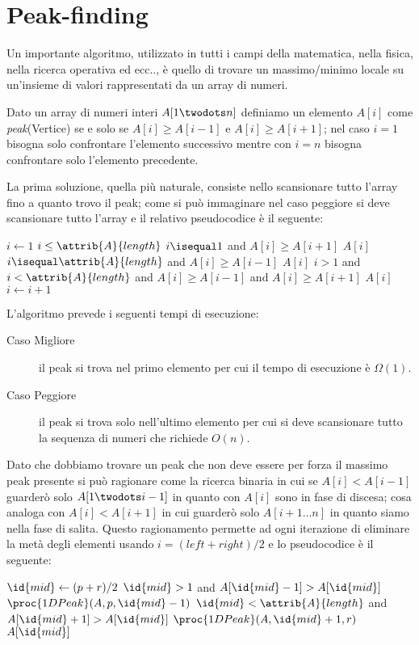 \section{Peak-finding}
Un importante algoritmo, utilizzato in tutti i campi della matematica, nella fisica,
nella ricerca operativa ed ecc.., è quello di trovare un massimo/minimo locale
su un'insieme di valori rappresentati da un array di numeri.

Dato un array di numeri interi $A[1 \twodots n]$ definiamo un elemento $A[i]$
come \emph{peak}(Vertice) se e solo se $A[i] \geq A[i-1]$ e $A[i] \geq A[i+1]$;
nel caso $i = 1$ bisogna solo confrontare l'elemento successivo mentre con $i=n$
bisogna confrontare solo l'elemento precedente.

La prima soluzione, quella più naturale, consiste nello scansionare tutto l'array
fino a quanto trovo il peak; come si può immaginare nel caso peggiore si deve scansionare
tutto l'array e il relativo pseudocodice è il seguente:
\begin{codebox}
\li $i \gets 1$
\li \While $i \leq \attrib{A}{length}$
    \Do
\li                \If $i \isequal 1$ and $A[i] \geq A[i+1]$
\li                          \Return $A[i]$
\li                \If $i \isequal \attrib{A}{length}$ and $A[i] \geq A[i-1]$
\li                          \Return $A[i]$
\li                \If $i > 1$ and $i < \attrib{A}{length}$ and $A[i] \geq A[i-1]$ and $A[i] \geq A[i+1]$
\li                          \Return $A[i]$
\li                $i \gets i + 1$
\end{codebox}

L'algoritmo prevede i seguenti tempi di esecuzione:
\begin{description}
  \item[Caso Migliore] il peak si trova nel primo elemento per cui il tempo di esecuzione è $\Omega(1)$.
  \item[Caso Peggiore] il peak si trova solo nell'ultimo elemento per cui si deve
                       scansionare tutto la sequenza di numeri che richiede $O(n)$.
\end{description}

Dato che dobbiamo trovare un peak che non deve essere per forza il massimo peak presente
si può ragionare come la ricerca binaria in cui se $A[i] < A[i-1]$ guarderò solo $A[1 \twodots i-1]$
in quanto con $A[i]$ sono in fase di discesa; cosa analoga con $A[i] < A[i+1]$ in cui
guarderò solo $A[i+1 \dots n]$ in quanto siamo nella fase di salita.
Questo ragionamento permette ad ogni iterazione di eliminare la metà degli elementi
usando $i = (left+right)/2$ e lo pseudocodice è il seguente:
\begin{codebox}
\li $\id{mid} \gets (p + r) / 2$
\li \If $\id{mid} > 1$ and $A[\id{mid}-1] > A[\id{mid}]$
    \Then
\li                   \Return $\proc{1DPeak}(A,p,\id{mid}-1)$
\li \Elif $\id{mid} < \attrib{A}{length}$ and $A[\id{mid} + 1] > A[\id{mid}]$
    \Then
\li                   \Return $\proc{1DPeak}(A,\id{mid}+1,r)$
\li \Else \Return $A[\id{mid}]$
\end{codebox}

